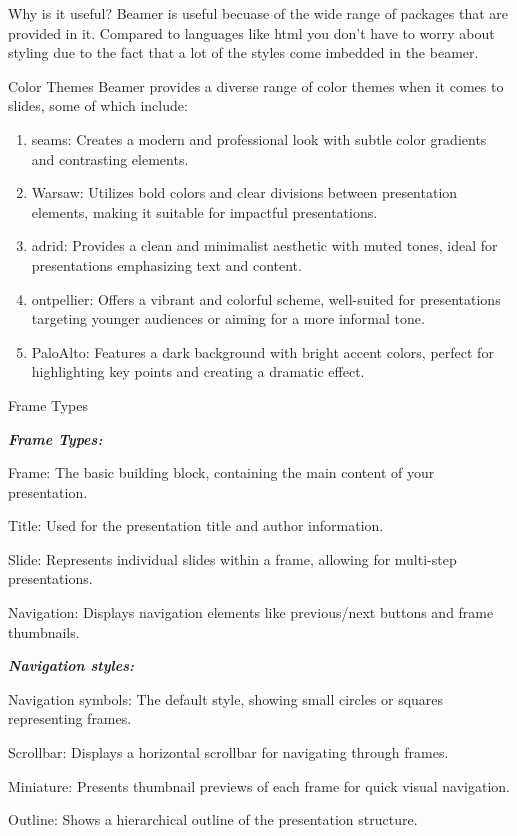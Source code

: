 \documentclass[pdf]{beamer}
\begin{document}
\begin{frame}{Why is it useful?}
    Beamer is useful becuase of the wide range of packages that are provided in it.
    Compared to languages like html you don't have to worry about styling due to the fact that
    a lot of the styles come imbedded in the beamer.
\end{frame}
\begin{frame}{Color Themes}
    Beamer provides a diverse range of color themes when it comes to slides, some of which include:
    \begin{enumerate}
        \item seams: Creates a modern and professional look with subtle color gradients and contrasting elements.
        \item Warsaw: Utilizes bold colors and clear divisions between presentation elements, making it suitable for impactful presentations.
        \item adrid: Provides a clean and minimalist aesthetic with muted tones, ideal for presentations emphasizing text and content.
        \item ontpellier: Offers a vibrant and colorful scheme, well-suited for presentations targeting younger audiences or aiming for a more informal tone.
        \item PaloAlto: Features a dark background with bright accent colors, perfect for highlighting key points and creating a dramatic effect.
    \end{enumerate}
        
\end{frame}
\begin{frame}{Frame Types}
    \par \textbf{\textit{Frame Types:}} 
\par Frame: The basic building block, containing the main content of your presentation.
\par Title: Used for the presentation title and author information.
\par Slide: Represents individual slides within a frame, allowing for multi-step presentations.
\par Navigation: Displays navigation elements like previous/next buttons and frame thumbnails.
\par \textbf{\textit{Navigation styles:}} 
\par Navigation symbols: The default style, showing small circles or squares representing frames.
\par Scrollbar: Displays a horizontal scrollbar for navigating through frames.
\par Miniature: Presents thumbnail previews of each frame for quick visual navigation.
\par Outline: Shows a hierarchical outline of the presentation structure.
\end{frame}
\end{document}
